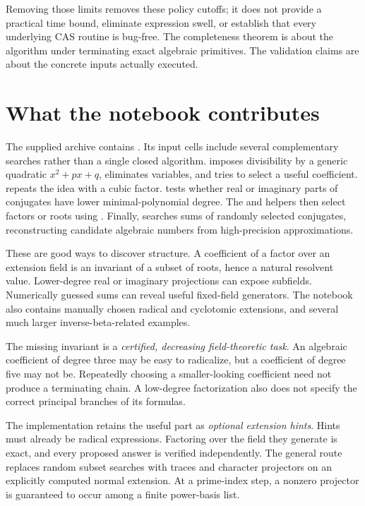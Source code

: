 \documentclass[11pt,letterpaper]{article}
\theoremstyle{definition}\newtheorem{definition}[theorem]{Definition}
\theoremstyle{remark}\newtheorem{remark}[theorem]{Remark}
\begin{document}
Removing those limits removes these policy cutoffs; it does not provide a
practical time bound, eliminate expression swell, or establish that every
underlying CAS routine is bug-free. The completeness theorem is about the
algorithm under terminating exact algebraic primitives. The validation claims
are about the concrete inputs actually executed.

\section{What the notebook contributes}
\label{sec:notebook}
The supplied archive contains . Its input cells include
several complementary searches rather than a single closed algorithm.
 imposes divisibility by a generic quadratic
\(x^2+px+q\), eliminates variables, and tries to select a useful coefficient.
 repeats the idea with a cubic factor.
 tests whether real or imaginary parts of conjugates have lower
minimal-polynomial degree. The  and  helpers then
select factors or roots using . Finally, 
searches sums of randomly selected conjugates, reconstructing candidate
algebraic numbers from high-precision approximations.

These are good ways to discover structure. A coefficient of a factor over an
extension field is an invariant of a subset of roots, hence a natural
resolvent value. Lower-degree real or imaginary projections can expose
subfields. Numerically guessed sums can reveal useful fixed-field generators.
The notebook also contains manually chosen radical and cyclotomic extensions,
and several much larger inverse-beta-related examples.

The missing invariant is a \emph{certified, decreasing field-theoretic task}.
An algebraic coefficient of degree three may be easy to radicalize, but a
coefficient of degree five may not be. Repeatedly choosing a smaller-looking
coefficient need not produce a terminating chain. A low-degree factorization
also does not specify the correct principal branches of its formulas.

The implementation retains the useful part as \emph{optional extension hints}.
Hints must already be radical expressions. Factoring over the field they
generate is exact, and every proposed answer is verified independently.
The general route replaces random subset searches with traces and character
projectors on an explicitly computed normal extension. At a prime-index step,
a nonzero projector is guaranteed to occur among a finite power-basis list.
\end{document}

